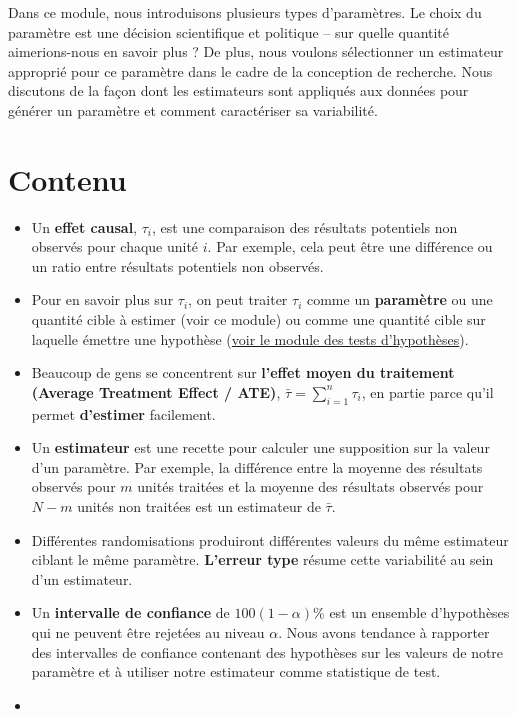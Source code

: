 \documentclass[
  12pt,
]{book}
\begin{document}
Dans ce module, nous introduisons plusieurs types d'paramètres. Le choix du paramètre est une décision scientifique et politique -- sur quelle quantité aimerions-nous en savoir plus ? De plus, nous voulons sélectionner un estimateur approprié pour ce paramètre dans le cadre de la conception de recherche. Nous discutons de la façon dont les estimateurs sont appliqués aux données pour générer un paramètre et comment caractériser sa variabilité.

\hypertarget{contenu-4}{%
\section{Contenu}\label{contenu-4}}

\begin{itemize}
\item
  Un \textbf{effet causal}, \(\tau_i\), est une comparaison des résultats potentiels non observés pour chaque unité \(i\). Par exemple, cela peut être une différence ou un ratio entre résultats potentiels non observés.
\item
  Pour en savoir plus sur \(\tau_{i}\), on peut traiter \(\tau_{i}\) comme un \textbf{paramètre} ou une quantité cible à estimer (voir ce module)
  ou comme une quantité cible sur laquelle émettre une hypothèse (\href{tests-dhypothèses.html}{voir le module des tests d'hypothèses}).
\item
  Beaucoup de gens se concentrent sur \textbf{l'effet moyen du traitement (Average Treatment Effect / ATE)}, \(\bar{\tau}=\sum_{i=1}^n  \tau_{i}\), en partie parce qu'il permet \textbf{d'estimer} facilement.
\item
  Un \textbf{estimateur} est une recette pour calculer une supposition sur la valeur d'un paramètre. Par exemple, la différence entre la moyenne des résultats observés pour \(m\) unités traitées et la moyenne des résultats observés pour \(N-m\) unités non traitées est un estimateur de \(\bar{\tau}\).
\item
  Différentes randomisations produiront différentes valeurs du même estimateur ciblant le même paramètre. \textbf{L'erreur type} résume cette variabilité au sein d'un estimateur.
\item
  Un \textbf{intervalle de confiance} de \(100(1-\alpha)\)\% est un ensemble d'hypothèses qui ne peuvent être rejetées au niveau \(\alpha\). Nous avons tendance à rapporter des intervalles de confiance contenant des hypothèses sur les valeurs de notre paramètre et à utiliser notre estimateur comme statistique de test.
\item

\end{itemize}
\end{document}
